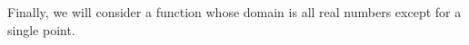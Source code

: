 \documentclass{ximera}
\begin{document}

Finally, we will consider a function whose domain is all real numbers
except for a single point.
\end{document}
